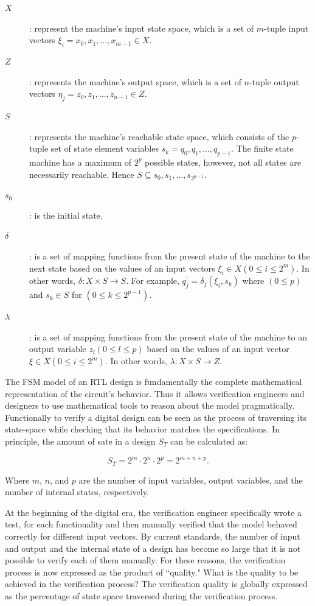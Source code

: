 \begin{description}
    \item[$X$] : represent the machine's input state space, which is a set of
      $m$-tuple input vectors $\xi_i = x_0,x_1,\dots, x_{m-1} \in X$.
    \item[$Z$] : represents the machine's output space, which is a set of
      $n$-tuple output vectors $\eta_j = z_0, z_1,\dots,z_{n-1} \in Z$.
    \item[$S$] : represents the machine's reachable state space, which consists
      of the $p$-tuple set of state element variables $s_k =q_0,q_1,\dots,
      q_{p-1}$. The finite state machine has a maximum of $2^p$ possible states,
      however, not all states are necessarily reachable. Hence $S \subseteq s_0,
      s_1,\dots, s_{2^{p-1}}$.
    \item[$s_0$] : is the initial state.
    \item[$\delta$] : is a set of mapping functions from the present state of
      the machine to the next state based on the values of an input vectors
      $\xi_i \in X (0 \leq i \leq 2^m)$. In other words, $\delta : X \times S
      \to S$. For example, $q_j^{'} = \delta_j(\xi_i,s_k)$ where $(0 \leq p)$
      and $s_k \in S$ for $(0 \leq k \leq 2^{p-1})$.
    \item[$\lambda$] : is a set of mapping functions from the present state of
      the machine to an output variable $z_l(0\leq l \leq p)$ based on the
      values of an input vector $\xi\in X (0 \leq i \leq 2^m)$. In other words,
      $\lambda: X \times S \to Z$.
\end{description}

The FSM model of an RTL design is fundamentally the complete mathematical
representation of the circuit's behavior. Thus it allows verification engineers
and designers to use mathematical tools to reason about the model pragmatically.
Functionally to verify a digital design can be seen as the process of traversing
its state-space while checking that its behavior matches the specifications. In
principle, the amount of sate in a design $S_T$ can be calculated as:

\begin{equation}
    S_T = 2^m \cdot 2^n \cdot 2^p = 2^{m + n + p}.
\end{equation}

Where $m$, $n$, and $p$ are the number of input variables, output variables, and
the number of internal states, respectively.

\par At the beginning of the digital era, the verification engineer specifically
wrote a test, for each functionality and then manually verified that the model
behaved correctly for different input vectors. By current standards, the number
of input and output and the internal state of a design has become so large that
it is not possible to verify each of them manually. For these reasons, the
verification process is now expressed as the product of ``quality." What is the
quality to be achieved in the verification process? The verification quality is
globally expressed as the percentage of state space traversed during the
verification process.

